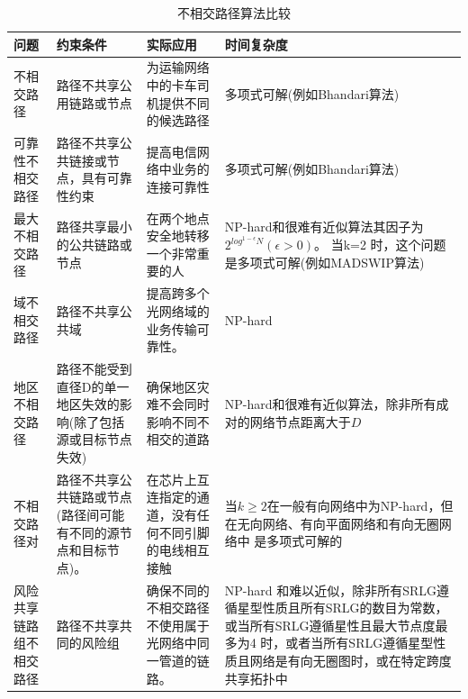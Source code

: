 \begin{table}[htb]
\caption{不相交路径算法比较}\label{tab:disjointPath}
\vspace{0.5em}\centering\wuhao
\begin{tabularx}{46em}{|*{4}{>{\centering\arraybackslash}X|}}
\toprule[1.5pt]
问题   & 约束条件   & 实际应用 & 时间复杂度  \\
\midrule[1pt]
不相交路径 & 路径不共享公用链路或节点 & 为运输网络中的卡车司机提供不同的候选路径 & 多项式可解(例如Bhandari算法\cite{bhandari1997optimal})\\
\hline
可靠性不相交路径 & 路径不共享公共链接或节点，具有可靠性约束 & 提高电信网络中业务的连接可靠性 & 多项式可解(例如Bhandari算法\cite{bhandari1997optimal})\\
\hline
最大不相交路径 & 路径共享最小的公共链路或节点 & 在两个地点安全地转移一个非常重要的人 & NP-hard和很难有近似算法其因子为$2^{log^{1-\epsilon}N}(\epsilon>0)$。 当k=2 时，这个问题是多项式可解(例如MADSWIP算法\cite{taft1999quality})\\
\hline
域不相交路径 & 路径不共享公共域 & 提高跨多个光网络域的业务传输可靠性。 & NP-hard\cite{gao2013domain}\\
\hline
地区不相交路径 & 路径不能受到直径D的单一地区失效的影响(除了包括源或目标节点失效) & 确保地区灾难不会同时影响不同不相交的道路 & NP-hard和很难有近似算法\cite{trajanovski2015finding}，除非所有成对的网络节点距离大于$D$\\
\hline
不相交路径对 & 路径不共享公共链路或节点(路径间可能有不同的源节点和目标节点)。 & 在芯片上互连指定的通道，没有任何不同引脚的电线相互接触 & 当$k\geq2$在一般有向网络中为NP-hard\cite{fortune1980directed}，但在无向网络\cite{robertson1995graph}、有向平面网络\cite{schrijver1994finding}和有向无圈网络中\cite{fortune1980directed} 是多项式可解的 \\
\hline
风险共享链路组不相交路径 & 路径不共享共同的风险组 & 确保不同的不相交路径不使用属于光网络中同一管道的链路。 & NP-hard\cite{hu2003diverse} 和难以近似\cite{coudert2007shared}，除非所有SRLG遵循星型性质且所有SRLG的数目为常数\cite{bermond2013srlg}，或当所有SRLG遵循星性且最大节点度最多为4\cite{bermond2013srlg} 时，或者当所有SRLG遵循星型性质且网络是有向无圈图\cite{bermond2013srlg}时，或在特定跨度共享拓扑\cite{bhandari1994optimal}中\\
\bottomrule[1.5pt]
\end{tabularx}
\vspace{\baselineskip}
\end{table}
